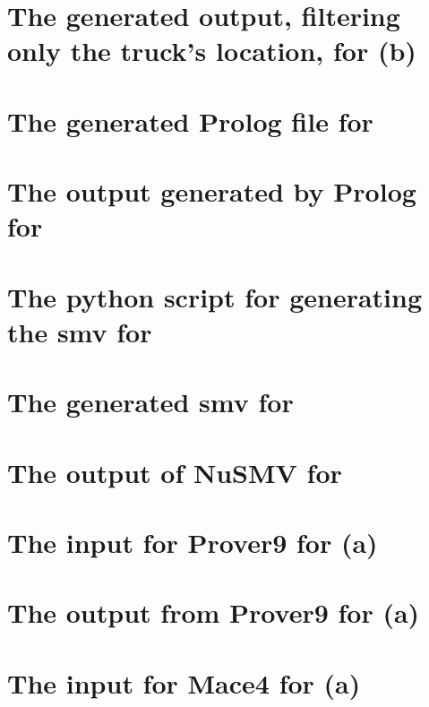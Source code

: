 \begin{appendices}
\chapter{The generated output, filtering only the truck's location, for (b)}
\label{app:1_c_out}


\chapter{The generated Prolog file for }
\label{app:2_prol_in}


\chapter{The output generated by Prolog for }
\label{app:2_prol_out}


\chapter{The python script for generating the smv for }
\label{app:2_smv_gen}


\chapter{The generated smv for }
\label{app:2_smv_in}


\chapter{The output of NuSMV for }
\label{app:2_smv_out}


\chapter{The input for Prover9 for (a)}
\label{app:3_a1_in}


\chapter{The output from Prover9 for (a)}
\label{app:3_a1_out}


\chapter{The input for Mace4 for (a)}
\label{app:3_a2_in}



\end{appendices}

